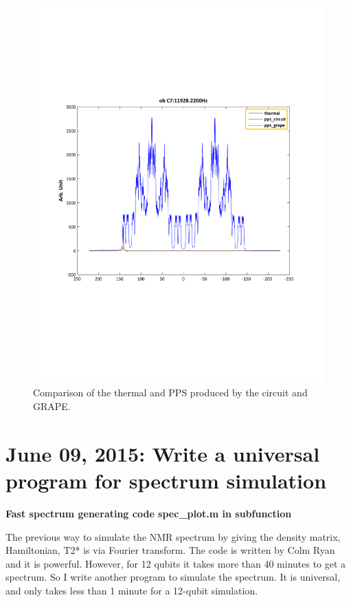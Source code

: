 \newpage
\begin{figure}[htb]
\begin{center}
\includegraphics[width=\columnwidth]{thermal_and_pps_circuit_grape.pdf}
\end{center}
\setlength{\abovecaptionskip}{-1cm}
\caption{\footnotesize{Comparison of the thermal and PPS produced by the circuit and GRAPE. }}\label{compare_spectra}
\end{figure}

\clearpage
\section{June 09, 2015: Write a universal program for spectrum simulation}

\textbf{Fast spectrum generating code spec\_plot.m in \dir subfunction}

The previous way to simulate the NMR spectrum by giving the density matrix, Hamiltonian, T2* is via Fourier transform. The code is written by Colm Ryan and it is powerful. However, for 12 qubits it takes more than 40 minutes to get a spectrum. So I write another program to simulate the spectrum. It is universal, and only takes less than 1 minute for a 12-qubit simulation.

